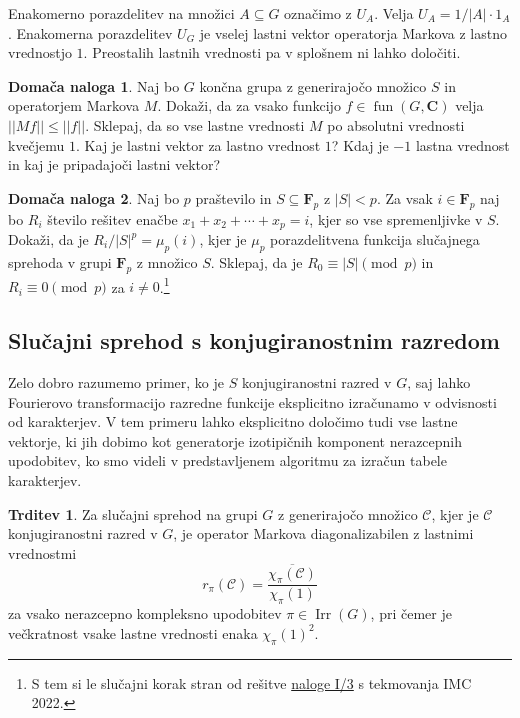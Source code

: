 \documentclass[11pt]{book}
\def\CC{\mathbf{C}}
\def\conclass{\mathcal{C}}
\def\FF{\mathbf{F}}
\DeclareMathOperator\Irr{Irr}
\DeclareMathOperator\fun{fun}
\theoremstyle{definition}
\theoremstyle{zgled}
\theoremstyle{odprtproblem}
\theoremstyle{domacanaloga}
\newtheorem*{domacanaloga}{Domača naloga}
\theoremstyle{izrek}
\newtheorem*{trditev}{Trditev}
\begin{document}
Enakomerno porazdelitev na množici $A \subseteq G$ označimo z $U_A$. Velja $U_A = 1/|A| \cdot 1_A$. Enakomerna porazdelitev $U_G$ je vselej lastni vektor operatorja Markova z lastno vrednostjo $1$. Preostalih lastnih vrednosti pa v splošnem ni lahko določiti.

\begin{domacanaloga}
Naj bo $G$ končna grupa z generirajočo množico $S$ in operatorjem Markova $M$. Dokaži, da za vsako funkcijo $f \in \fun(G,\CC)$ velja $||Mf|| \leq ||f||$. Sklepaj, da so vse lastne vrednosti $M$ po absolutni vrednosti kvečjemu $1$. Kaj je lastni vektor za lastno vrednost $1$? Kdaj je $-1$ lastna vrednost in kaj je pripadajoči lastni vektor?
\end{domacanaloga}

\begin{domacanaloga}
Naj bo $p$ praštevilo in  $S \subseteq \FF_p$ z $|S| < p$. Za vsak $i \in \FF_p$ naj bo $R_i$ število rešitev enačbe $x_1 + x_2 + \cdots + x_p = i$, kjer so vse spremenljivke v $S$. Dokaži, da je $R_i / |S|^p = \mu_p(i)$, kjer je $\mu_p$ porazdelitvena funkcija slučajnega sprehoda v grupi $\FF_p$ z množico $S$. Sklepaj, da je $R_0 \equiv |S| \pmod{p}$ in $R_i \equiv 0 \pmod{p}$ za $i \neq 0$.\footnote{S tem si le slučajni korak stran od rešitve \href{https://www.imc-math.org.uk/imc2022/imc2022day1questions.pdf}{naloge I/3} s tekmovanja IMC 2022.}
\end{domacanaloga}    

\subsection{Slučajni sprehod s konjugiranostnim razredom}

Zelo dobro razumemo primer, ko je $S$ konjugiranostni razred v $G$, saj lahko Fourierovo transformacijo razredne funkcije eksplicitno izračunamo v odvisnosti od karakterjev. V tem primeru lahko eksplicitno določimo tudi vse lastne vektorje, ki jih dobimo kot generatorje izotipičnih komponent nerazcepnih upodobitev, ko smo videli v predstavljenem algoritmu za izračun tabele karakterjev.

\begin{trditev}
Za slučajni sprehod na grupi $G$ z generirajočo množico $\conclass$, kjer je $\conclass$ konjugiranostni razred v $G$, je operator Markova diagonalizabilen z lastnimi vrednostmi
\[
    r_{\pi}(\conclass) = \frac{\overline{\chi_{\pi}(\conclass)}}{\chi_{\pi}(1)}
\]
za vsako nerazcepno kompleksno upodobitev $\pi \in \Irr(G)$, pri čemer je večkratnost vsake lastne vrednosti enaka $\chi_{\pi}(1)^2$.
\end{trditev}
\end{document}
